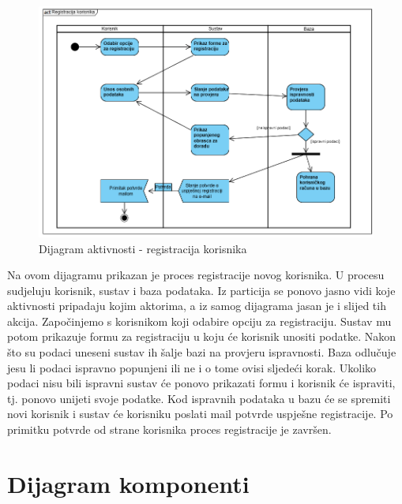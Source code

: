 			
			 \begin{figure}[H]
               			 \includegraphics[width=\textwidth,height=0.5\textheight]{dijagrami/DijagramAktivnosti2.png}%
				\centering
				\caption{Dijagram aktivnosti - registracija korisnika}
				\label{fig:ActivityDiagram2}
			\end{figure}

		Na ovom dijagramu prikazan je proces registracije novog korisnika. U procesu sudjeluju korisnik, sustav i baza podataka. Iz particija se ponovo jasno vidi koje aktivnosti pripadaju kojim aktorima, a iz samog dijagrama jasan je i slijed tih akcija. Započinjemo s korisnikom koji odabire opciju za registraciju. Sustav mu potom prikazuje formu za registraciju u koju će korisnik unositi podatke. Nakon što su podaci uneseni sustav ih šalje bazi na provjeru ispravnosti. Baza odlučuje jesu li podaci ispravno popunjeni ili ne i o tome ovisi sljedeći korak. Ukoliko podaci nisu bili ispravni sustav će ponovo prikazati formu i korisnik će ispraviti, tj. ponovo unijeti svoje podatke. Kod ispravnih podataka u bazu će se spremiti novi korisnik i sustav će korisniku poslati mail potvrde uspješne registracije. Po primitku potvrde od strane korisnika proces registracije je završen.

			\eject 
		
			
			
		\section{Dijagram komponenti}

